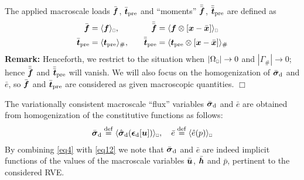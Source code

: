 \documentclass{bmcart}
\newcommand{\eqtref}[1]{\eqref{#1}}
\DeclarePairedDelimiter{\homgen}{\langle}{\rangle_\rve}
\newcommand{\prescribed}{\mathrm{pre}}
\renewcommand{\dev}{\mathrm{d}}
\newcommand{\volume}{|\Omega_\rve|}
\newcommand{\rve}{
  {\mathchoice
   {\mbox{\scalebox{0.67}{$\Box$}}}
   {\mbox{\scalebox{0.67}{$\Box$}}}
   {\mbox{\scalebox{0.5}{$\Box$}}}
   {\mbox{\scalebox{0.375}{$\Box$}}}
  }
}
\begin{document}
The applied macroscale loads $\bar{\boldsymbol{f}}$, $\bar{\ta t}_\prescribed$ and ``moments'' $\bar{\bar{\boldsymbol{f}}}$, $\bar{\bar{\ta t}}_\prescribed$ are defined as
\begin{alignat}{2}
    \bar{\ta f} &= \homgen{ \ta{f} },\quad
    &\bar{\bar{\ta f}} &= \homgen{ \ta{f}\outerp[\ta{x}-\bar{\ta{x}}] }
\label{eq15fa}
\\
    \bar{\ta t}_\prescribed &= \langle \ta{t}_\prescribed \rangle_\#,\quad
    &\bar{\bar{\ta t}}_\prescribed &= \langle \ta{t}_\prescribed\outerp[\ta{x}-\bar{\ta{x}}]  \rangle_\#
\end{alignat}
\textbf{Remark:} Henceforth, we restrict to the situation when $\volume\to 0$ and $|\Gamma_\#|\to 0$; hence $\bar{\bar{\boldsymbol{f}}}$ and $\bar{\bar{\ta t}}_\prescribed$ will vanish.
We will also focus on the homogenization of $\bar{\ts\sigma}_\dev$ and $\bar{e}$, so $\bar{\boldsymbol{f}}$ and $\bar{\ta t}_\prescribed$ are considered as given macroscopic quantities. $\Box$

The variationally consistent macroscale ``flux'' variables $\bar{\ts{\sigma}}_\dev$ and $\bar{e}$ are obtained from homogenization of the constitutive functions as follows:
\begin{align}
    \bar{\ts{\sigma}}_\dev \defeq \homgen{ \hat{\ts{\sigma}}_\dev(\ts{\epsilon}_\dev[\ta{u}]) }, \quad
    \bar{e} \defeq \homgen{ \hat{e}(p) }
\label{eq16}
\end{align}
By combining \eqtref{eq4} with \eqtref{eq12} we note that $\bar{\ts\sigma}_\dev$ and $\bar{e}$ are indeed implicit functions of the values of the macroscale variables $\bar{\boldsymbol{u}}$, $\bar{\boldsymbol{h}}$ and $\bar{p}$, pertinent to the considered RVE.
\end{document}
